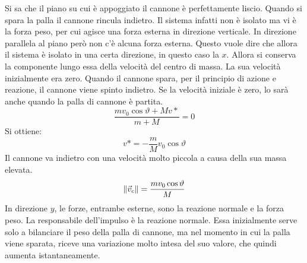 \documentclass[10pt,a4paper]{book}
\DeclarePairedDelimiter{\norma}{\lVert}{\rVert} %
\begin{document}
\begin{figure}[htpb]
\end{figure}
\FloatBarrier
Si sa che il piano su cui è appoggiato il cannone è perfettamente liscio. Quando si spara la palla il cannone rincula indietro. Il sistema infatti non è isolato ma vi è la forza peso, per cui agisce una forza esterna in direzione verticale. In direzione parallela al piano però non c'è alcuna forza esterna. Questo vuole dire che allora il sistema è isolato in una certa direzione, in questo caso la $x$. Allora si conserva la componente lungo essa della velocità del centro di massa. La sua velocità inizialmente era zero. Quando il cannone spara, per il principio di azione e reazione, il cannone viene spinto indietro. Se la velocità iniziale è zero, lo sarà anche quando la palla di cannone è partita.
\[
	\frac{mv_0 \cos\vartheta+ Mv*}{m+M} =0
\]
Si ottiene:
\[
	v*=-\frac{m}{M}v_0\cos\vartheta
\]
Il cannone va indietro con una velocità molto piccola a causa della sua massa elevata.
\[
	\norma{\vec{v}_c}=\frac{mv_0\cos\vartheta}{M}
\]
In direzione $y$, le forze, entrambe esterne, sono la reazione normale e la forza peso. La responsabile dell'impulso è la reazione normale. Essa inizialmente serve solo a bilanciare il peso della palla di cannone, ma nel momento in cui la palla viene sparata, riceve una variazione molto intesa del suo valore, che quindi aumenta istantaneamente.
\end{document}

